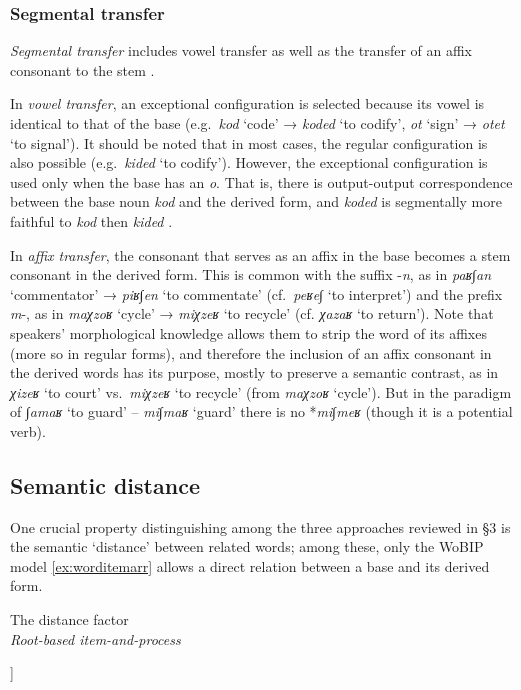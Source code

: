 \documentclass[output=paper,
modfonts
]{LSP/langsci}
\begin{document}
\subsubsection{Segmental transfer}
\emph{Segmental transfer} includes vowel transfer as well as the
transfer of an affix consonant to the stem \citep{Batel1994}.

In \emph{vowel transfer}, an exceptional configuration is selected
because its vowel is identical to that of the base (e.g.\ \emph{kod}
`code' → \emph{koded} `to codify', \emph{ot} `sign' → \emph{otet} `to
signal'). It should be noted that in most cases, the regular
configuration is also possible (e.g.\ \emph{kided} `to codify'). However,
the exceptional configuration is used only when the base has an
\emph{o}. That is, there is output-output correspondence between the
base noun \emph{kod} and the derived form, and \emph{koded} is
segmentally more faithful to \emph{kod} then \emph{kided} \citep{batel2003a}.

In \emph{affix transfer}, the consonant that serves as an affix in the
base becomes a stem consonant in the derived form. This is common with
the suffix -\emph{n}, as in \emph{paʁ∫an} `commentator' → \emph{piʁ∫en}
`to commentate' (cf.\ \emph{peʁe∫} `to interpret') and the prefix
\emph{m}-, as in \emph{maχzoʁ} `cycle' → \emph{miχzeʁ} `to recycle' (cf.
\emph{χazaʁ} `to return'). Note that speakers' morphological knowledge
allows them to strip the word of its affixes (more so in regular forms),
and therefore the inclusion of an affix consonant in the derived words
has its purpose, mostly to preserve a semantic contrast, as in
\emph{χizeʁ} `to court' vs.\ \emph{miχzeʁ} `to recycle' (from
\emph{maχzoʁ} `cycle'). But in the paradigm of \emph{∫amaʁ} `to guard'
-- \emph{mi∫maʁ} `guard' there is no *\emph{mi∫meʁ} (though it is a
potential verb).

\subsection{Semantic distance} 

One crucial property distinguishing among the three approaches reviewed in §3 is the
semantic `distance' between related words; among these, only the WoBIP model \cref{ex:worditemarr} allows a 
direct relation between a base and its derived form.

\ea\label{ex:distance}The distance factor\\
\ea \emph{Root-based item-and-process}\\
\begin{forest}
	[√sdʁ
	[sidéʁ\\`to arrange']
	[sédeʁ\\`order']
	]
\end{forest}
\end{document}
